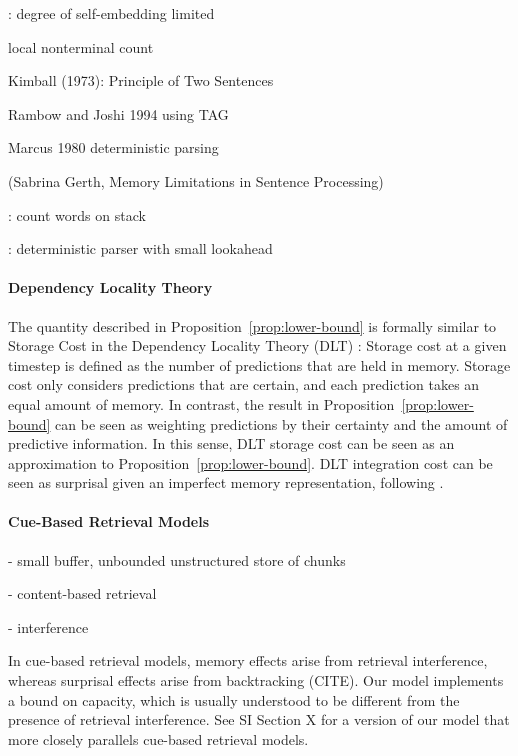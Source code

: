 \cite{miller-finitary-1963}: degree of self-embedding limited

\cite{frazier1985syntactic} local nonterminal count

Kimball (1973): Principle of Two Sentences

Rambow and Joshi 1994 using TAG

Marcus 1980 deterministic parsing

(Sabrina Gerth, Memory Limitations in Sentence Processing)

\cite{gerth2009unifying}


\cite{wanner1978atn}
\cite{frazier1978sausage}

\cite{rambow201512}: count words on stack

\cite{boston2012computational}

\cite{just1992capacity}

\cite{marcus1978theory}: deterministic parser with small lookahead

\paragraph{Dependency Locality Theory}
The quantity described in Proposition~\ref{prop:lower-bound} is formally similar to Storage Cost in the Dependency Locality Theory (DLT) \citep{gibson-linguistic-1998}: Storage cost at a given timestep is defined as the number of predictions that are held in memory.
Storage cost only considers predictions that are certain, and each prediction takes an equal amount of memory.
In contrast, the result in Proposition~\ref{prop:lower-bound} can be seen as weighting predictions by their certainty and the amount of predictive information.
In this sense, DLT storage cost can be seen as an approximation to Proposition~\ref{prop:lower-bound}.
DLT integration cost can be seen as surprisal given an imperfect memory representation, following \cite{futrell-noisy-context-2017}.

\paragraph{Cue-Based Retrieval Models}
- small buffer, unbounded unstructured store of chunks

- content-based retrieval

- interference


In cue-based retrieval models, memory effects arise from retrieval interference, whereas surprisal effects arise from backtracking (CITE).
Our model implements a bound on capacity, which is usually understood to be different from the presence of retrieval interference.
See SI Section X for a version of our model that more closely parallels cue-based retrieval models.

